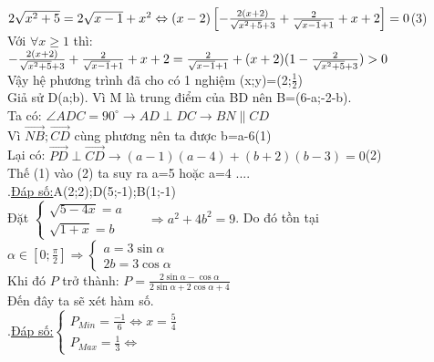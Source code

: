 $2\sqrt{x^{2}+5}=2\sqrt{x-1}+x^{2}\\
\Leftrightarrow (x-2)\left [ -\frac{2(x+2)}{\sqrt{x^{2}+5}+3}+\frac{2}{\sqrt{x-1}+1}+x+2 \right ]=0$\hspace{5mm}(3)\\
Với $\forall x\geq 1$ thì:\\
 $-\frac{2(x+2)}{\sqrt{x^{2}+5}+3}+\frac{2}{\sqrt{x-1}+1}+x+2\\
=\frac{2}{\sqrt{x-1}+1}+(x+2)(1-\frac{2}{\sqrt{x^{2}+5}+3})> 0$\\
Vậy hệ phương trình đã cho có 1 nghiệm (x;y)=(2;$\frac{1}{2}$)\\
\hda 
Giả sử D(a;b). Vì M là trung điểm của BD nên B=(6-a;-2-b).\\
Ta có: $\angle ADC=90^{\circ}\rightarrow AD\perp DC\rightarrow BN\parallel CD$\\
Vì $\vec{NB};\vec{CD}$ cùng phương nên ta được b=a-6\hspace{5mm}(1)\\
Lại có: $\vec{PD}\perp \vec{CD}\rightarrow (a-1)(a-4)+(b+2)(b-3)=0$\hspace{5mm}(2)\\
Thế (1) vào (2) ta suy ra a=5 hoặc a=4
....\\
.\hspace{10cm}\underline{Đáp số:}A(2;2);D(5;-1);B(1;-1)\\
\hda 
Đặt $\left\{\begin{matrix}
\sqrt{5-4x}=a &  & \\ 
\sqrt{1+x}=b &  & 
\end{matrix}\right.\Rightarrow a^{2}+4b^{2}=9$.
Do đó tồn tại $\alpha \in \left [ 0;\frac{\pi }{2} \right ]\Rightarrow \left\{\begin{matrix}
a=3\sin\alpha  &  & \\ 
2b=3\cos\alpha  &  & 
\end{matrix}\right.$\\
Khi đó $P$ trở thành:
$P=\frac{2\sin\alpha -\cos\alpha }{2\sin\alpha +2\cos\alpha +4}$\\
Đến đây ta sẽ xét hàm số.\\
.\hspace{10cm}\underline{Đáp số:}$\left\{\begin{matrix}
P_{Min}=\frac{-1}{6}\Leftrightarrow x=\frac{5}{4} &  & \\ 
P_{Max}=\frac{1}{3}\Leftrightarrow  &  & 
\end{matrix}\right.$\\

